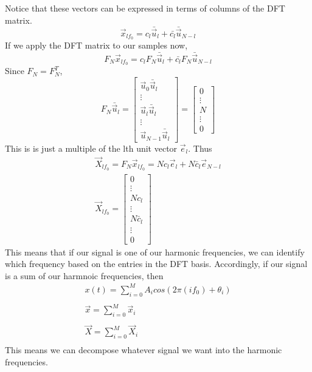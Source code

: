 \documentclass{article}
\begin{document}
Notice that these vectors can be expressed in terms of columns of the DFT matrix.
$$\vec{x}_{lf_0} = c_l\bar{\vec{u}}_l+\bar{c_l}\bar{\vec{u}}_{N-l}$$
If we apply the DFT matrix to our samples now, 
$$F_N\vec{x}_{lf_0} = c_lF_N\bar{\vec{u}}_l+\bar{c_l}F_N\bar{\vec{u}}_{N-l}$$
Since $F_N=F_N^T$,
\[
    F_N\bar{\vec{u}}_l = \left[
        \begin{array}{c}
            \vec{u}_0\bar{\vec{u}}_l\\
            \vdots\\
            \vec{u}_l\bar{\vec{u}}_l\\
            \vdots\\
            \vec{u}_{N-1}\bar{\vec{u}}_l
        \end{array}
    \right] = \left[
        \begin{array}{c}
            0\\
            \vdots\\
            N\\
            \vdots\\
            0
        \end{array}
    \right]
\]
This is is just a multiple of the lth unit vector $\vec{e}_l$.
Thus
\[
    \begin{array}{c}
        \vec{X}_{lf_0} = F_N\vec{x}_{lf_0} = Nc_l\vec{e}_l+N\bar{c}_l\vec{e}_{N-l}\\
        \vec{X}_{lf_0} = \left[
            \begin{array}{c}
                0\\
                \vdots\\
                Nc_l\\
                \vdots\\
                N\bar{c}_l\\
                \vdots\\
                0
            \end{array}
        \right]
    \end{array}
\]
This means that if our signal is one of our harmonic frequencies, 
we can identify which frequency based on the entries in the DFT basis.
Accordingly, if our signal is a sum of our harmnoic frequencies, then
\[
    \begin{array}{c}
        x(t) = \sum_{i=0}^{M}{A_icos(2\pi(if_0)+\theta_i)}\\\\
        \vec{x} = \sum_{i=0}^{M}{\vec{x}_i}\\\\
        \vec{X} = \sum_{i=0}^{M}{\vec{X}_i}\\
    \end{array}
\]
This means we can decompose whatever signal we want into the harmonic frequencies.
\end{document}
